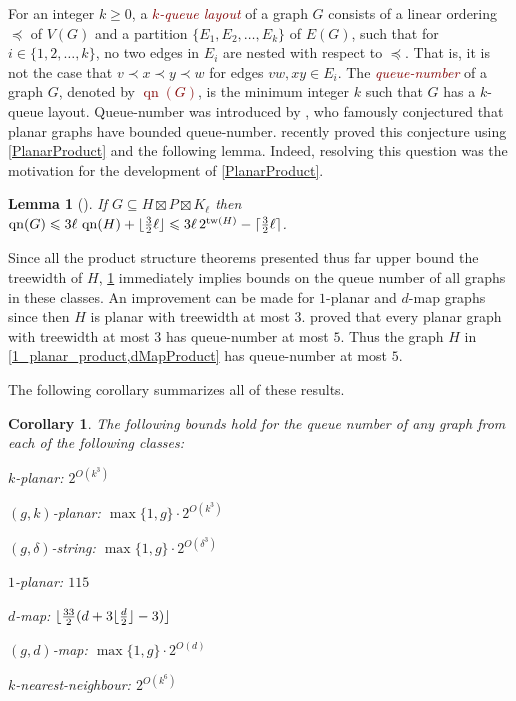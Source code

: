 \documentclass{patmorin}
\theoremstyle{plain}
\newtheorem{lem}[thm]{Lemma}
\newtheorem{cor}[thm]{Corollary}
\theoremstyle{definition}
\newcommand{\defin}[1]{\textcolor{Maroon}{\emph{#1}}}
\DeclareMathOperator{\tw}{tw}
\DeclareMathOperator{\qn}{qn}
\DeclarePairedDelimiter{\ceil}{\lceil}{\rceil}
\DeclarePairedDelimiter{\floor}{\lfloor}{\rfloor}
\renewcommand{\geq}{\geqslant}
\renewcommand{\leq}{\leqslant}
\begin{document}
For an integer $k\geq 0$, a \defin{$k$-queue layout} of a graph $G$ consists of a linear ordering $\preceq$ of $V(G)$ and a partition $\{E_1,E_2,\dots,E_k\}$ of $E(G)$, such that for $i\in\{1,2,\dots,k\}$, no two edges in $E_i$ are nested with respect to $\preceq$. That is, it is not the case that $v\prec x \prec y \prec w$ for edges $vw,xy\in E_i$. The \defin{queue-number} of a graph $G$, denoted by \defin{$\qn(G)$}, is the minimum integer $k$ such that $G$ has a $k$-queue layout. Queue-number was introduced by \citet{HLR92}, who famously conjectured that planar graphs have bounded queue-number. \citet{DJMMUW20} recently proved this conjecture using \cref{PlanarProduct} and the following lemma. Indeed, resolving this question was the motivation for the development of \cref{PlanarProduct}.

\begin{lem}[\citep{DJMMUW20}]
\label{qn}
If $G\subseteq H \boxtimes P \boxtimes K_\ell$ then
$\qn(G) \leq  3 \ell \, \qn(H) + \floor{\tfrac{3}{2}\ell}
\leq 3 \ell \, 2^{\tw(H)}  - \ceil{\tfrac{3}{2}\ell}$.
\end{lem}

Since all the product structure theorems presented thus far upper bound the treewidth of $H$, \cref{qn} immediately implies bounds on the queue number of all graphs in these classes.  An improvement can be made for $1$-planar and $d$-map graphs since then $H$ is planar with treewidth at most $3$. \citet{ABGKP20} proved that every planar graph with treewidth at most $3$ has queue-number at most $5$. Thus the graph $H$ in \cref{1_planar_product,dMapProduct} has queue-number at most $5$.

The following corollary summarizes all of these results.
\begin{cor}\label{q_cor}
  The following bounds hold for the queue number of any graph from each of the following classes:
  \begin{compactitem}
    \item $k$-planar: $2^{O(k^3)}$
    \item $(g,k)$-planar: $\max\{1,g\}\cdot 2^{O(k^3)}$
    \item $(g,\delta)$-string: $\max\{1,g\}\cdot 2^{O(\delta^3)}$
    \item $1$-planar: $115$
    \item $d$-map: $\floor{ \frac{33}{2} (d+3\floor{\frac{d}{2}}-3) }$
    \item $(g,d)$-map: $\max\{1,g\}\cdot 2^{O(d)}$
    \item $k$-nearest-neighbour: $2^{O(k^6)}$
  \end{compactitem}
\end{cor}
\end{document}
